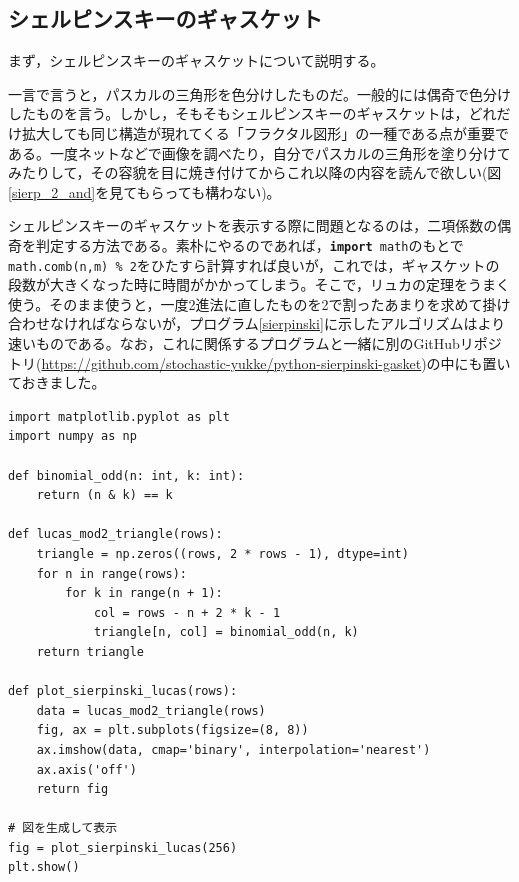 \subsection{シェルピンスキーのギャスケット}
まず，シェルピンスキーのギャスケットについて説明する。

一言で言うと，パスカルの三角形を色分けしたものだ。一般的には偶奇で色分けしたものを言う。しかし，そもそもシェルピンスキーのギャスケットは，どれだけ拡大しても同じ構造が現れてくる「フラクタル図形」の一種である点が重要である。一度ネットなどで画像を調べたり，自分でパスカルの三角形を塗り分けてみたりして，その容貌を目に焼き付けてからこれ以降の内容を読んで欲しい(図\ref{sierp_2_and}を見てもらっても構わない)。

\vspace{10pt}

シェルピンスキーのギャスケットを表示する際に問題となるのは，二項係数の偶奇を判定する方法である。素朴にやるのであれば，\texttt{\textbf{import} math}のもとで\texttt{math.comb(n,m) \% 2}をひたすら計算すれば良いが，これでは，ギャスケットの段数が大きくなった時に時間がかかってしまう。そこで，リュカの定理をうまく使う。そのまま使うと，一度2進法に直したものを2で割ったあまりを求めて掛け合わせなければならないが，プログラム\ref{sierpinski}に示したアルゴリズムはより速いものである。なお，これに関係するプログラムと一緒に別のGitHubリポジトリ(\url{https://github.com/stochastic-yukke/python-sierpinski-gasket})の中にも置いておきました。

\begin{lstlisting}[caption=uszczelka Sierpińskiego,label=sierpinski]
import matplotlib.pyplot as plt
import numpy as np

def binomial_odd(n: int, k: int):
    return (n & k) == k

def lucas_mod2_triangle(rows):
    triangle = np.zeros((rows, 2 * rows - 1), dtype=int)
    for n in range(rows):
        for k in range(n + 1):
            col = rows - n + 2 * k - 1
            triangle[n, col] = binomial_odd(n, k)
    return triangle

def plot_sierpinski_lucas(rows):
    data = lucas_mod2_triangle(rows)
    fig, ax = plt.subplots(figsize=(8, 8))
    ax.imshow(data, cmap='binary', interpolation='nearest')
    ax.axis('off')
    return fig

# 図を生成して表示
fig = plot_sierpinski_lucas(256)
plt.show()
\end{lstlisting}

